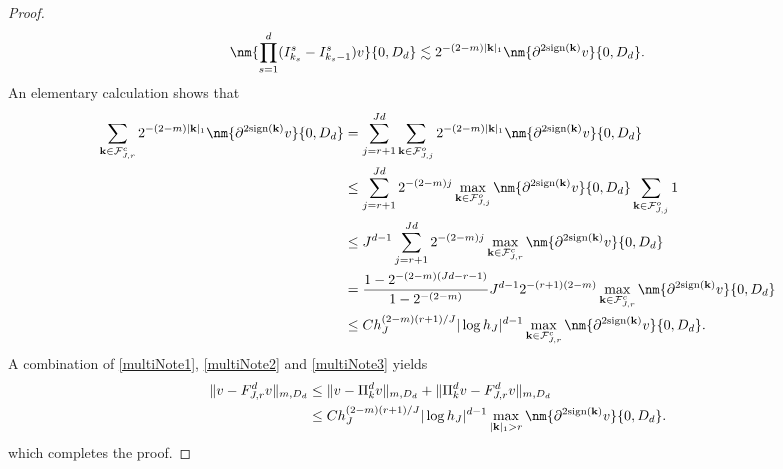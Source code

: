 \begin{proof}
\begin{equation}\label{multiNote2}
\nm {\prod_{s=1}^d(I^s_{k_s}-I^s_{k_s-1})v}{0, D_d} 
\lesssim 2^{-(2-m)|\mathbf k |_1}\nm {\partial^{2\text{sign}(\mathbf k)}v}{0,D_d}.
\end{equation}
An elementary calculation shows that
\begin{equation}\label{multiNote3}
\begin{split}
\sum_{\mathbf k\in \mathcal{F}_{J,r}^c}2^{-(2-m)|\mathbf k |_1}\nm {\partial^{2\text{sign}(\mathbf k)}v}{0,D_d}
&=\sum_{j=r+1}^{Jd}\sum_{\mathbf k \in \mathcal F_{J,j}^o}2^{-(2-m)|\mathbf k |_1}\nm {\partial^{2\text{sign}(\mathbf k)}v}{0,D_d}\\
&\leq\sum_{j=r+1}^{Jd} 2^{-(2-m)j}  \max_{\mathbf k \in \mathcal F_{J,j}^o}\nm {\partial^{2\text{sign}(\mathbf k)}v}{0,D_d}\sum_{\mathbf k \in \mathcal F_{J,j}^o}1\\
&\le J^{d-1}\sum_{j=r+1}^{Jd} 2^{-(2-m)j} \max_{\mathbf k\in \mathcal{F}_{J,r}^c}\nm {\partial^{2\text{sign}(\mathbf k)}v}{0,D_d}\\
&=\frac{1-2^{-(2-m)(Jd-r-1)}}{1-2^{-(2-m)}} J^{d-1}2^{-(r+1)(2-m)}\max_{\mathbf k\in \mathcal{F}_{J,r}^c}\nm {\partial^{2\text{sign}(\mathbf k)}v}{0,D_d}\\
&\le C h_J^{(2-m)(r+1)/J}|\log h_J|^{d-1}\max_{\mathbf k\in \mathcal{F}_{J,r}^c}\nm {\partial^{2\text{sign}(\mathbf k)}v}{0,D_d}.
\end{split}
\end{equation}
A combination of \eqref{multiNote1}, \eqref{multiNote2} and \eqref{multiNote3} yields
\begin{equation} 
\begin{split}
\| v-F_{J,r}^d v\|_{m, D_d}&\leq \| v-\Pi_k^d v\|_{m,D_d} + \| \Pi_k^d v-F_{J,r}^d v\|_{m,D_d}
\\
&\le C h_J^{(2-m)(r+1)/J}|\log h_J|^{d-1}\max_{|\mathbf k|_1> r}\nm {\partial^{2\text{sign}(\mathbf k)}v}{0,D_d}. 
\end{split}
\end{equation}
which completes the proof.
\end{proof}
